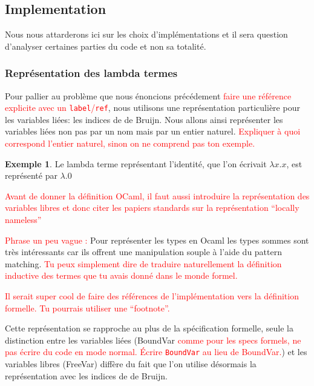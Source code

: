 \documentclass {article}
\newcommand{\codefrom}[3]
           {}
\theoremstyle{definition}
\newtheorem{example}{Exemple}
\theoremstyle{remark}
\newcommand{\todo}[1]{\textcolor{red}{#1}}
\begin{document}
\subsection{Implementation}

Nous nous attarderons ici sur les choix d'implémentations et il sera question
d'analyser certaines parties du code et non sa totalité.

\subsubsection{Représentation des lambda termes}
 
Pour pallier au problème que nous énoncions précédement \todo{faire
  une référence explicite avec un \verb!label!/\verb!ref!}, nous
utilisons une représentation particulière pour les variables liées:
les indices de de Bruijn.  Nous allons ainsi représenter les variables
liées non pas par un nom mais par un entier naturel. \todo{Expliquer à
  quoi correspond l'entier naturel, sinon on ne comprend pas ton
  exemple.}

\begin{example}
  Le lambda terme représentant l'identité, que l'on écrivait \(\lambda x.x\), est représenté par \(\lambda.0\)
\end{example}

\todo{Avant de donner la définition OCaml, il faut aussi introduire la
  représentation des variables libres et donc citer les papiers
  standards sur la représentation ``locally nameless''}

\todo{Phrase un peu vague :} Pour représenter les types en Ocaml les
types sommes sont très intéressants car ils offrent une manipulation
souple à l'aide du pattern matching. \todo{Tu peux simplement dire de
  traduire naturellement la définition inductive des termes que tu
  avais donné dans le monde formel.}

\codefrom{untyped}{lambda}{untyped_term}

\todo{Il serait super cool de faire des références de l'implémentation
  vers la définition formelle. Tu pourrais utiliser une ``footnote''.}

Cette représentation se rapproche au plus de la spécification
formelle, seule la distinction entre les variables liées (BoundVar
\todo{comme pour les specs formels, ne pas écrire du code en mode
  normal. Écrire \lstinline!BoundVar! au lieu de BoundVar.}) et les
variables libres (FreeVar) diffère du fait que l'on utilise désormais
la représentation avec les indices de de Bruijn.
\end{document}
